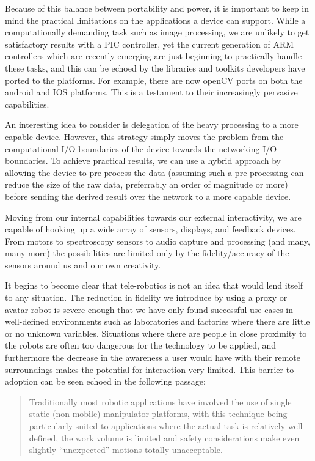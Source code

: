 \documentclass[a4paper,12pt]{report}
\begin{document}
Because of this balance between portability and power, it is important to keep in mind the practical limitations on the applications a device can support. While a computationally demanding task such as image processing, we are unlikely to get satisfactory results with a PIC controller, yet the current generation of ARM controllers which are recently emerging are just beginning to practically handle these tasks, and this can be echoed by the libraries and toolkits developers have ported to the platforms. For example, there are now openCV ports on both the android and IOS platforms. This is a testament to their increasingly pervasive capabilities.

An interesting idea to consider is delegation of the heavy processing to a more capable device. However, this strategy simply moves the problem from the computational I/O boundaries of the device towards the networking I/O boundaries. To achieve practical results, we can use a hybrid approach by allowing the device to pre-process the data (assuming such a pre-processing can reduce the size of the raw data, preferrably an order of magnitude or more) before sending the derived result over the network to a more capable device.

Moving from our internal capabilities towards our external interactivity, we are capable of hooking up a wide array of sensors, displays, and feedback devices. From motors to spectroscopy sensors to audio capture and processing (and many, many more) the possibilities are limited only by the fidelity/accuracy of the sensors around us and our own creativity.

It begins to become clear that tele-robotics is not an idea that would lend itself to any situation. The reduction in fidelity we introduce by using a proxy or avatar robot is severe enough that we have only found successful use-cases in well-defined environments such as laboratories and factories where there are little or no unknown variables. Situations where there are people in close proximity to the robots are often too dangerous for the technology to be applied, and furthermore the decrease in the awareness a user would have with their remote surroundings makes the potential for interaction very limited. This barrier to adoption can be seen echoed in the following passage:

\begin{quote}
	Traditionally most robotic applications have involved the use of single static (non-mobile) manipulator platforms, with this technique being particularly suited to applications where the actual task is relatively well defined, the work volume is limited and safety considerations make even slightly “unexpected” motions totally unacceptable.
	\begin{flushright}
		\cite{540147}
	\end{flushright}
\end{quote}
\end{document}

